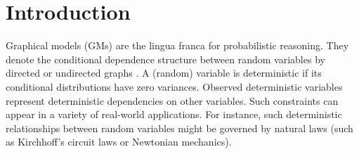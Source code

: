 \documentclass{article}
\begin{document}
\section{Introduction}
\label{sec:intro}
Graphical models (GMs) are the lingua franca for probabilistic reasoning.
They denote the conditional dependence structure between random variables by directed or undirected graphs \cite{koller2009probabilistic}. A (random) variable is deterministic if its conditional distributions have zero variances. 
Observed deterministic variables represent deterministic dependencies on other variables.
Such constraints can appear in a variety of real-world applications.
For instance, 
such deterministic relationships between random variables might be governed by natural laws 
(such as Kirchhoff's circuit laws or Newtonian mechanics).
\end{document}
